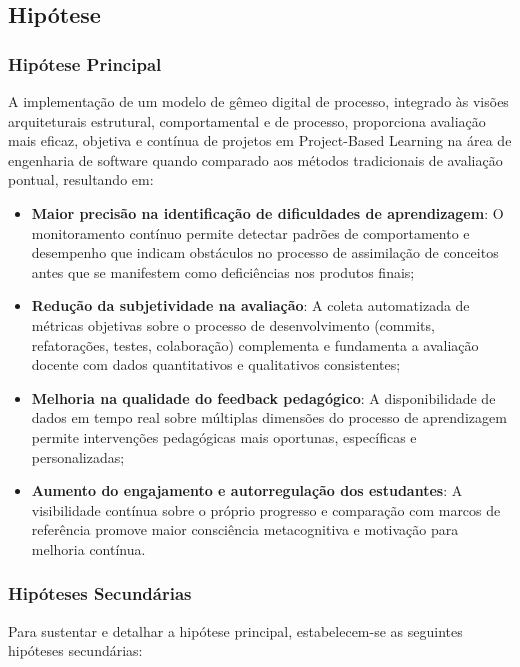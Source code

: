 \documentclass[12pt,a4paper]{article}
\begin{document}
\subsection{Hipótese}

\subsubsection{Hipótese Principal}

A implementação de um modelo de gêmeo digital de processo, integrado às visões arquiteturais estrutural, comportamental e de processo, proporciona avaliação mais eficaz, objetiva e contínua de projetos em Project-Based Learning na área de engenharia de software quando comparado aos métodos tradicionais de avaliação pontual, resultando em:

\begin{itemize}
\item \textbf{Maior precisão na identificação de dificuldades de aprendizagem}: O monitoramento contínuo permite detectar padrões de comportamento e desempenho que indicam obstáculos no processo de assimilação de conceitos antes que se manifestem como deficiências nos produtos finais;

\item \textbf{Redução da subjetividade na avaliação}: A coleta automatizada de métricas objetivas sobre o processo de desenvolvimento (commits, refatorações, testes, colaboração) complementa e fundamenta a avaliação docente com dados quantitativos e qualitativos consistentes;

\item \textbf{Melhoria na qualidade do feedback pedagógico}: A disponibilidade de dados em tempo real sobre múltiplas dimensões do processo de aprendizagem permite intervenções pedagógicas mais oportunas, específicas e personalizadas;

\item \textbf{Aumento do engajamento e autorregulação dos estudantes}: A visibilidade contínua sobre o próprio progresso e comparação com marcos de referência promove maior consciência metacognitiva e motivação para melhoria contínua.
\end{itemize}

\subsubsection{Hipóteses Secundárias}

Para sustentar e detalhar a hipótese principal, estabelecem-se as seguintes hipóteses secundárias:
\end{document}
